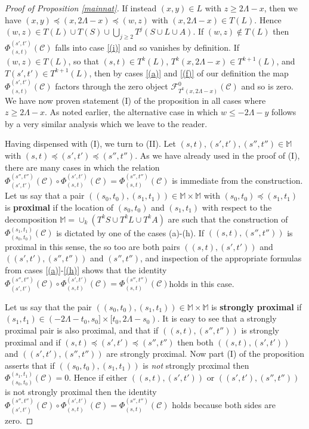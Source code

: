 \documentclass[11pt]{amsart}
\theoremstyle{definition}
\theoremstyle{remark}
\numberwithin{equation}{section}
\begin{document}
\begin{proof}[Proof of Proposition \ref{mainnat}]
If instead $(x,y)\in L$ with $z\geq 2\Lambda-x$, then we have $(x,y)\preceq (x,2\Lambda-x)\preceq (w,z)$ with $(x,2\Lambda-x)\in T(L)$.  Hence $(w,z)\in T(L)\cup T(S)\cup\bigcup_{j\geq 2}T^j(S\cup L\cup A)$. If $(w,z)\notin T(L)$ then $\Phi_{(s,t)}^{(s',t')}(\mathcal{C})$ falls into case \ref{(i)} and so vanishes by definition.  If $(w,z)\in T(L)$, so that $(s,t)\in T^k(L)$, $T^k(x,2\Lambda-x)\in T^{k+1}(L)$, and $T(s',t')\in T^{k+1}(L)$, then by cases \ref{(a)} and \ref{(f)} of our definition the map $\Phi_{(s,t)}^{(s',t')}(\mathcal{C})$ factors through the zero object $\mathcal{F}^{0}_{T^k(x,2\Lambda-x)}(\mathcal{C})$ and so is zero.  We have now proven statement (I) of the proposition in all cases where $z\geq 2\Lambda-x$. As noted earlier, the alternative case in which $w\leq -2\Lambda-y$ follows by a very similar analysis which we leave to the reader.

Having dispensed with (I), we turn to (II).  Let $(s,t),(s',t'),(s'',t'')\in \mathbb{M}$ with $(s,t)\preceq (s',t')\preceq (s'',t'')$.  As we have already used in the proof of (I), there are many cases in which the relation $\Phi_{(s',t')}^{(s'',t'')}(\mathcal{C}) \circ
  \Phi_{(s,t)}^{(s',t')}(\mathcal{C})=\Phi_{(s,t)}^{(s'',t'')}(\mathcal{C})$ is immediate from the construction.  Let us say that a pair $\left((s_0,t_0),(s_1,t_1)\right)\in\mathbb{M}\times\mathbb{M}$ with $(s_0,t_0)\preceq (s_1,t_1)$ is \textbf{proximal} if the location of $(s_0,t_0)$ and $(s_1,t_1)$ with respect to the decomposition $\mathbb{M}=\cup_k(T^kS\cup T^kL\cup T^kA)$ are such that the construction of $\Phi_{(s_0,t_0)}^{(s_1,t_1)}(\mathcal{C})$ is dictated by one of the cases (a)-(h). If $\left((s,t),(s'',t'')\right)$ is proximal in this sense, the so too are both pairs $\left((s,t),(s',t')\right)$ and $\left((s',t'),(s'',t'')\right)$ and $(s'',t'')$, and inspection of the appropriate formulas from cases \ref{(a)}-\ref{(h)} shows that the identity $\Phi_{(s',t')}^{(s'',t'')}(\mathcal{C}) \circ
  \Phi_{(s,t)}^{(s',t')}(\mathcal{C})=\Phi_{(s,t)}^{(s'',t'')}(\mathcal{C})$holds in this case.  
  
  Let us say that the pair $\left((s_0,t_0),(s_1,t_1)\right)\in \mathbb{M}\times\mathbb{M}$ is \textbf{strongly proximal} if $(s_1,t_1)\in (-2\Lambda-t_0,s_0]\times [t_0,2\Lambda-s_0)$. It is easy to see that a strongly proximal pair is also proximal, and that if $\left((s,t),(s'',t'')\right)$ is strongly proximal and if $(s,t)\preceq (s',t')\preceq (s'',t'')$ then both  $\left((s,t),(s',t')\right)$ and $\left((s',t'),(s'',t'')\right)$ are strongly proximal.  Now part (I) of the proposition asserts that if $\left((s_0,t_0),(s_1,t_1)\right)$ is \emph{not} strongly proximal then $\Phi_{(s_0,t_0)}^{(s_1,t_1)}(\mathcal{C})=0$.  Hence if either $\left((s,t),(s',t')\right)$ or  $\left((s',t'),(s'',t'')\right)$ is not strongly proximal then the identity $\Phi_{(s',t')}^{(s'',t'')}(\mathcal{C}) \circ
  \Phi_{(s,t)}^{(s',t')}(\mathcal{C})=\Phi_{(s,t)}^{(s'',t'')}(\mathcal{C})$
holds because both sides are zero.


\end{proof}
\end{document}
